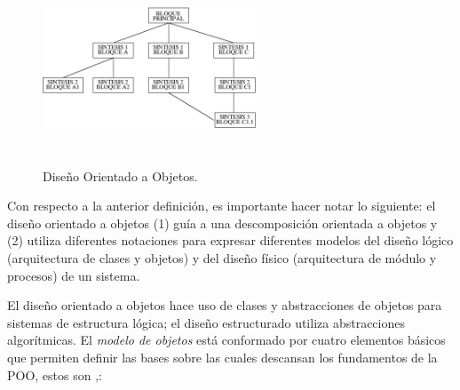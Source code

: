 \documentclass[10pt,twocolumn,twoside,letterpaper]{IEEEtran}
\begin{document}
{\begin{figure}[hbtp]
	\centering
	\includegraphics[height=2.25in,width=2.5in]{figures/ed.eps}
	\caption{Dise\~no Orientado a Objetos.}
	\label{fig:sd}
\end{figure}

Con respecto a la anterior definici\'on, es importante hacer notar lo siguiente: el dise\~no o\-rien\-ta\-do a objetos (1) gu\'ia a una descomposici\'on orientada a objetos y (2) utiliza di\-fe\-ren\-tes notaciones para expresar diferentes modelos del dise\~no l\'ogico (arquitectura de clases y objetos) y del dise\~no f\'isico (arquitectura de m\'odulo y procesos) de un sistema.

El dise\~no orientado a objetos hace uso de clases y abstracciones de objetos para sistemas de estructura l\'ogica; el dise\~no estructurado utiliza abstracciones algor\'itmicas. El {\it modelo de objetos} est\'a conformado por cuatro elementos b\'asicos que permiten definir las bases sobre las cuales descansan los fundamentos de la POO, estos son \cite{joyanes},\cite{booch}:

}
\end{document}
